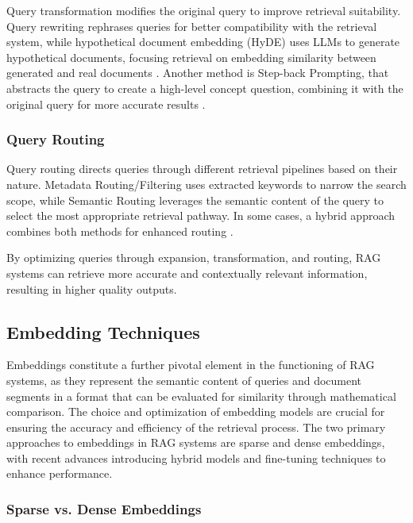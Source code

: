 Query transformation modifies the original query to improve retrieval suitability. Query rewriting rephrases queries for better compatibility with the retrieval system, while hypothetical document embedding (HyDE) uses LLMs to generate hypothetical documents, focusing retrieval on embedding similarity between generated and real documents \cite{gao2022precise}. Another method is Step-back Prompting, that abstracts the query to create a high-level concept question, combining it with the original query for more accurate results \cite{zheng2023take}.

\subsubsection{Query Routing}

Query routing directs queries through different retrieval pipelines based on their nature. Metadata Routing/Filtering uses extracted keywords to narrow the search scope, while Semantic Routing leverages the semantic content of the query to select the most appropriate retrieval pathway. In some cases, a hybrid approach combines both methods for enhanced routing \cite{gao2023retrieval}.\newline

By optimizing queries through expansion, transformation, and routing, RAG systems can retrieve more accurate and contextually relevant information, resulting in higher quality outputs.

\subsection{Embedding Techniques}

Embeddings constitute a further pivotal element in the functioning of RAG systems, as they represent the semantic content of queries and document segments in a format that can be evaluated for similarity through mathematical comparison. The choice and optimization of embedding models are crucial for ensuring the accuracy and efficiency of the retrieval process. The two primary approaches to embeddings in RAG systems are sparse and dense embeddings, with recent advances introducing hybrid models and fine-tuning techniques to enhance performance.

\subsubsection{Sparse vs. Dense Embeddings}

